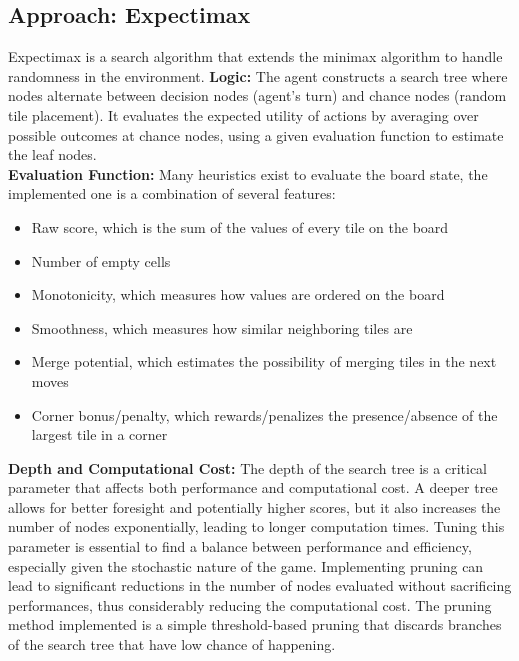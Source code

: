 \documentclass[letterpaper]{article} %
\begin{document}
\subsection{Approach: Expectimax}
Expectimax is a search algorithm that extends the minimax algorithm to handle randomness in the environment.
\textbf{Logic:} The agent constructs a search tree where nodes alternate between decision nodes (agent's turn) and chance nodes (random tile placement).
It evaluates the expected utility of actions by averaging over possible outcomes at chance nodes, using a given evaluation function to estimate the leaf nodes. \\
\textbf{Evaluation Function:} Many heuristics exist to evaluate the board state, the implemented one is a combination of several features:
\begin{itemize}
    \item Raw score, which is the sum of the values of every tile on the board
    \item Number of empty cells
    \item Monotonicity, which measures how values are ordered on the board
    \item Smoothness, which measures how similar neighboring tiles are
    \item Merge potential, which estimates the possibility of merging tiles in the next moves
    \item Corner bonus/penalty, which rewards/penalizes the presence/absence of the largest tile in a corner
\end{itemize}
\textbf{Depth and Computational Cost:} The depth of the search tree is a critical parameter that affects both performance and computational cost.
A deeper tree allows for better foresight and potentially higher scores, but it also increases the number of nodes exponentially, leading to longer computation times.
Tuning this parameter is essential to find a balance between performance and efficiency, especially given the stochastic nature of the game.
Implementing pruning can lead to significant reductions in the number of nodes evaluated without sacrificing performances, thus considerably reducing the computational cost.
The pruning method implemented is a simple threshold-based pruning that discards branches of the search tree that have low chance of happening.
\end{document}
